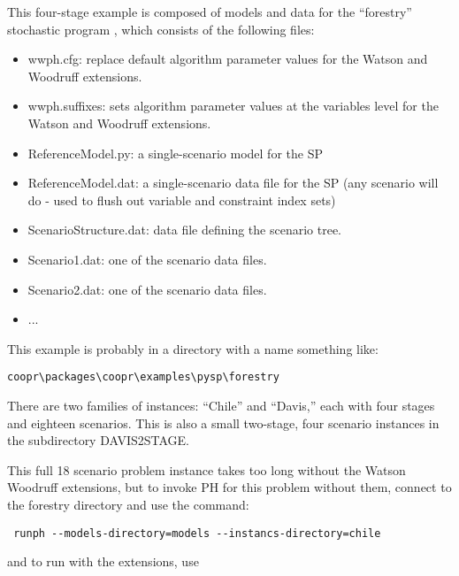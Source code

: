 This four-stage example is composed of models and data for the ``forestry''
stochastic program \cite{}, which consists of the following files:

\begin{itemize}
  \item wwph.cfg: replace default algorithm parameter values for the Watson and
  Woodruff extensions.

  \item wwph.suffixes: sets algorithm parameter values at the variables level
  for the Watson and Woodruff extensions.

  \item ReferenceModel.py: a single-scenario model for the SP

  \item ReferenceModel.dat: a single-scenario data file for the SP (any scenario
  will do - used to flush out variable and constraint index sets)

  \item ScenarioStructure.dat: data file defining the scenario tree.

  \item Scenario1.dat: one of the scenario data files.

  \item Scenario2.dat: one of the scenario data files.

  \item ...
\end{itemize}

This example is probably in a directory with a name something like:

\begin{verbatim}
coopr\packages\coopr\examples\pysp\forestry
\end{verbatim}

There are two families of instances: ``Chile'' and ``Davis,'' each with four
stages and eighteen scenarios. This is also a small two-stage, four scenario
instances in the subdirectory DAVIS2STAGE.

This full 18 scenario problem instance takes too long without the Watson
Woodruff extensions, but to invoke PH for this problem without them, connect to
the forestry directory and use the command:

\begin{verbatim}
 runph --models-directory=models --instancs-directory=chile
\end{verbatim}

and to run with the extensions, use

